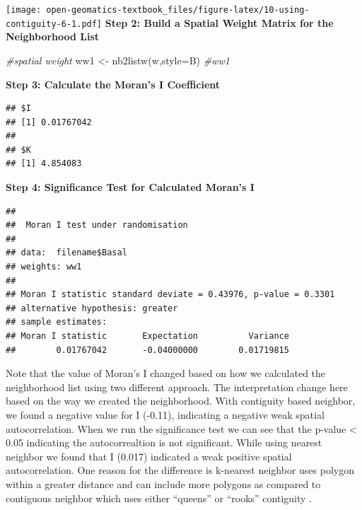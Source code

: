 \documentclass[
]{book}
\newenvironment{Shaded}{\begin{snugshade}}{\end{snugshade}}
\newcommand{\AttributeTok}[1]{\textcolor[rgb]{0.77,0.63,0.00}{#1}}
\newcommand{\CommentTok}[1]{\textcolor[rgb]{0.56,0.35,0.01}{\textit{#1}}}
\newcommand{\DocumentationTok}[1]{\textcolor[rgb]{0.56,0.35,0.01}{\textbf{\textit{#1}}}}
\newcommand{\FunctionTok}[1]{\textcolor[rgb]{0.00,0.00,0.00}{#1}}
\newcommand{\NormalTok}[1]{#1}
\newcommand{\OtherTok}[1]{\textcolor[rgb]{0.56,0.35,0.01}{#1}}
\newcommand{\SpecialCharTok}[1]{\textcolor[rgb]{0.00,0.00,0.00}{#1}}
\newcommand{\StringTok}[1]{\textcolor[rgb]{0.31,0.60,0.02}{#1}}
\begin{document}
\texttt{[image: open-geomatics-textbook\_files/figure-latex/10-using-contiguity-6-1.pdf]}
\textbf{Step 2: Build a Spatial Weight Matrix for the Neighborhood List}

\begin{Shaded}
\begin{Highlighting}[]
\CommentTok{\#spatial weight }
\NormalTok{ww1 }\OtherTok{\textless{}{-}} \FunctionTok{nb2listw}\NormalTok{(w,}\AttributeTok{style=}\StringTok{\textquotesingle{}B\textquotesingle{}}\NormalTok{)}
\CommentTok{\#ww1}
\end{Highlighting}
\end{Shaded}

\textbf{Step 3: Calculate the Moran's I Coefficient}

\begin{Shaded}
\end{Shaded}

\begin{verbatim}
## $I
## [1] 0.01767042
## 
## $K
## [1] 4.854083
\end{verbatim}

\textbf{Step 4: Significance Test for Calculated Moran's I}

\begin{Shaded}
\end{Shaded}

\begin{verbatim}
## 
##  Moran I test under randomisation
## 
## data:  filename$Basal  
## weights: ww1    
## 
## Moran I statistic standard deviate = 0.43976, p-value = 0.3301
## alternative hypothesis: greater
## sample estimates:
## Moran I statistic       Expectation          Variance 
##        0.01767042       -0.04000000        0.01719815
\end{verbatim}

Note that the value of Moran's I changed based on how we calculated the neighborhood list using two different approach. The interpretation change here based on the way we created the neighborhood. With contiguity based neighbor, we found a negative value for I (-0.11), indicating a negative weak spatial autocorrelation. When we run the significance test we can see that the p-value \textless{} 0.05 indicating the autocorrealtion is not significant. While using nearest neighbor we found that I (0.017) indicated a weak positive spatial autocorrelation. One reason for the difference is k-nearest neighbor uses polygon within a greater distance and can include more polygons as compared to contiguous neighbor which uses either ``queens'' or ``rooks'' contiguity \citep{Suryowati2018}.
\end{document}
